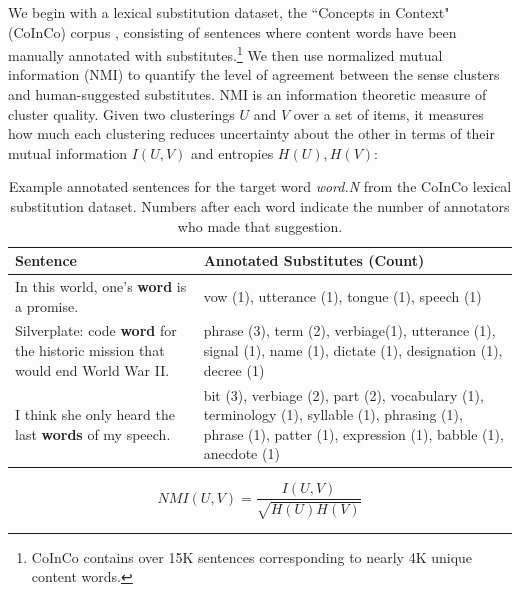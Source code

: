 \documentclass[11pt]{article}
\begin{document}
We begin with a %
lexical substitution dataset, the ``Concepts in Context" (CoInCo) corpus \cite{kremer-EtAl:2014:EACL}, consisting of sentences where content words have been manually annotated with substitutes.\footnote{CoInCo contains over 15K sentences corresponding to nearly 4K unique content words.} 
We then use normalized mutual information (NMI) \cite{strehl2002cluster} to quantify the level of agreement between the sense clusters and human-suggested substitutes. NMI is an information theoretic measure of cluster quality. Given two clusterings $U$ and $V$ over a set of items, it measures how much each clustering reduces uncertainty about the other \cite{vinh2009information} in terms of their mutual information $I(U,V)$ and entropies $H(U), H(V)$:

\begin{table}[t]
	\small
	\begin{tabular}{p{} p{}}
		\hline
		Sentence & Annotated Substitutes (Count) \\ \hline \hline
		In this world, one's \textbf{word} is a promise. & vow (1), utterance (1), tongue (1), speech (1) \\ \hline
		Silverplate: code \textbf{word} for the historic mission that would end World War II. & phrase (3), term (2), verbiage(1), utterance (1), signal (1), name (1), dictate (1), designation (1), decree (1) \\ \hline
		I think she only heard the last \textbf{words} of my speech. & bit (3), verbiage (2), part (2), vocabulary (1), terminology (1), syllable (1), phrasing (1), phrase (1), patter (1), expression (1), babble (1), anecdote (1) \\
	\end{tabular}
	\caption{Example annotated sentences for the target word \textit{word.N} from the CoInCo lexical substitution dataset. Numbers after each word indicate the number of annotators who made that suggestion.}
	\label{tab:lexsub}
\end{table}

%
%

\[NMI(U,V) = \frac{I(U,V)}{\sqrt{H(U)H(V)}}\]
\end{document}
